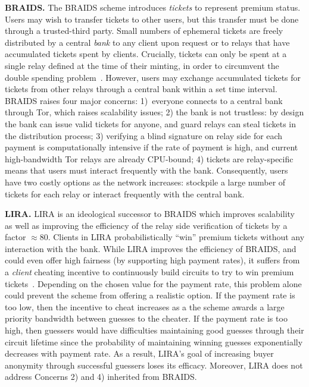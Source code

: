 \medskip\noindent\textbf{BRAIDS.}
The BRAIDS scheme introduces \emph{tickets} to represent premium status.
Users may wish to transfer tickets to other users, but this transfer must be done through a trusted-third party.
Small numbers of ephemeral tickets are freely distributed by a central \emph{bank} to any client upon request or to relays that have accumulated tickets spent by clients.
Crucially, tickets can only be spent at a single relay defined at the time of their minting, in order to circumvent the double spending problem~\cite{jansen2010recruiting}.
However, users may exchange accumulated tickets for tickets from other relays through a central bank within a set time interval.
BRAIDS raises four major concerns: 1)~everyone connects to a central bank through Tor, which raises scalability issues; 2) the bank is not trustless: by design the bank can issue valid tickets for anyone, and guard relays can steal tickets in the distribution process; 3) verifying a blind signature on relay side for each payment is computationally intensive if the rate of payment is high, and current high-bandwidth Tor relays are already CPU-bound; 4) tickets are relay-specific means that users must interact frequently with the bank.
Consequently, users have two costly options as the network increases: stockpile a large number of tickets for each relay or interact frequently with the central bank.

\medskip\noindent\textbf{LIRA.}
LIRA is an ideological successor to BRAIDS which improves scalability as well as improving the efficiency of the relay side verification of tickets by a factor $\approx 80$.
Clients in LIRA probabilistically ``win'' premium tickets without any interaction with the bank.
While LIRA improves the efficiency of BRAIDS, and could even offer high fairness (by supporting high payment rates), it suffers from a \textit{client} cheating incentive to continuously build circuits to try to win premium tickets~\cite{jansen2013lira, jansenblogpost}.
Depending on the chosen value for the payment rate, this problem alone could prevent the scheme from offering a realistic option.
If the payment rate is too low, then the incentive to cheat increases as a the scheme awards a large priority bandwidth between guesses to the cheater.
If the payment rate is too high, then guessers would have difficulties maintaining good guesses through their circuit lifetime since the probability of maintaining winning guesses exponentially decreases with payment rate.
As a result, LIRA's goal of increasing buyer anonymity through successful guessers loses its efficacy.
Moreover, LIRA does not address Concerns 2) and 4) inherited from BRAIDS.

